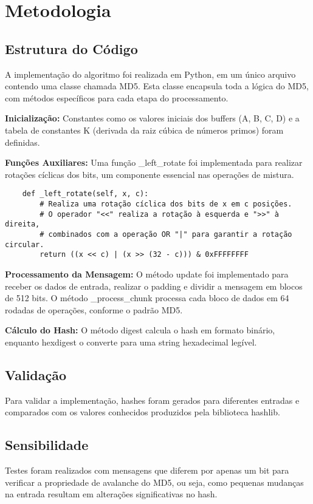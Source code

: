 \documentclass{article}
\begin{document}
\section{Metodologia}
\subsection{Estrutura do Código}
A implementação do algoritmo foi realizada em Python, em um único arquivo contendo uma classe chamada MD5. Esta classe encapsula toda a lógica do MD5, com métodos específicos para cada etapa do processamento.

\textbf{Inicialização:} Constantes como os valores iniciais dos buffers (A, B, C, D) e a tabela de constantes K (derivada da raiz cúbica de números primos) foram definidas.

\textbf{Funções Auxiliares:} Uma função \_left\_rotate foi implementada para realizar rotações cíclicas dos bits, um componente essencial nas operações de mistura.

\begin{verbatim}
    def _left_rotate(self, x, c):
        # Realiza uma rotação cíclica dos bits de x em c posições.
        # O operador "<<" realiza a rotação à esquerda e ">>" à direita,
        # combinados com a operação OR "|" para garantir a rotação circular.
        return ((x << c) | (x >> (32 - c))) & 0xFFFFFFFF
\end{verbatim}

\textbf{Processamento da Mensagem:} O método update foi implementado para receber os dados de entrada, realizar o padding e dividir a mensagem em blocos de 512 bits. O método \_process\_chunk processa cada bloco de dados em 64 rodadas de operações, conforme o padrão MD5.

\textbf{Cálculo do Hash:} O método digest calcula o hash em formato binário, enquanto hexdigest o converte para uma string hexadecimal legível.

\subsection{Validação}
Para validar a implementação, hashes foram gerados para diferentes entradas e comparados com os valores conhecidos produzidos pela biblioteca hashlib.

\subsection{Sensibilidade}
Testes foram realizados com mensagens que diferem por apenas um bit para verificar a propriedade de avalanche do MD5, ou seja, como pequenas mudanças na entrada resultam em alterações significativas no hash.
\end{document}

